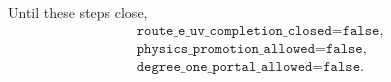 \documentclass[11pt]{article}
\theoremstyle{definition}
\theoremstyle{remark}
\begin{document}
Until these steps close,
\begin{equation}
 \boxed{\begin{gathered}
 \texttt{route\_e\_uv\_completion\_closed=false},\\
 \texttt{physics\_promotion\_allowed=false},\\
 \texttt{degree\_one\_portal\_allowed=false}.
 \end{gathered}}
 \label{eq:final-gates}
\end{equation}



\end{document}
